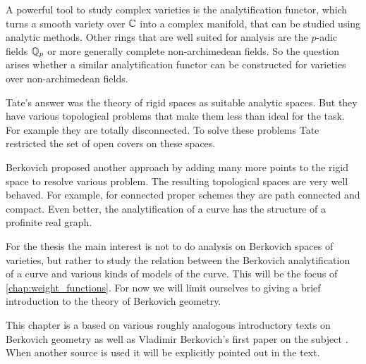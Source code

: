 
A powerful tool to study complex varieties is the analytification functor, which turns a  smooth variety over $\mathbb{C}$ into a complex manifold, that can be studied using analytic methods. 
Other rings that are well suited for analysis are the $p$-adic fields $\mathbb{Q}_p$ or more generally complete non-archimedean fields. 
So the question arises whether a similar analytification functor can be constructed for  varieties over non-archimedean fields. 

Tate's answer was the theory of rigid spaces as suitable analytic spaces. 
But they have various topological problems that make them less than ideal for the task. 
For example they are totally disconnected. To solve these problems Tate restricted the set of open covers on these spaces. 

Berkovich proposed another approach by adding many more points to the rigid space to resolve various problem. 
The resulting topological spaces are very well behaved. 
For example, for connected proper schemes they are path connected and compact. 
Even better, the analytification of a curve has the structure of a profinite real graph. 

For the thesis the main interest is not to do analysis on Berkovich spaces of varieties, but rather to study the relation between the Berkovich analytification of a curve and various kinds of models of the curve. This will be the focus of \cref{chap:weight_functions}. 
For now we will limit ourselves to giving a brief introduction to the theory of Berkovich geometry. 

This chapter is a based on various roughly analogous introductory texts on Berkovich geometry \cite{bakerarizona,temkinIntroductionBerkovichAnalytic2010,nicaiseNonarchimedeanGeometry2017,boschLecturesFormalRigid2014, wojciechwawrowBerkovicSpaces2020} as well as Vladimir Berkovich's first paper on the subject \cite{berkovichSpectralTheoryAnalytic2012}.
When another source is used it will be explicitly pointed out in the text. 


